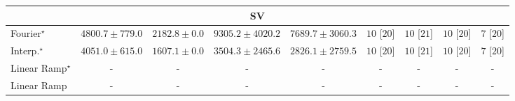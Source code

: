\begin{tabular}{l|cccc|cccc|}
\cline{1-9}
\multicolumn{9}{c}{\rule{0pt}{8pt}SV} \\
\midrule
Fourier$^\star$ & {\cellcolor[HTML]{96B6D7}} \color[HTML]{000000} $4800.7\pm 779.0$ & {\cellcolor[HTML]{F4EDF6}} \color[HTML]{000000} $2182.8\pm 0.0$ & {\cellcolor[HTML]{023858}} \color[HTML]{F1F1F1} $9305.2\pm 4020.2$ & {\cellcolor[HTML]{0569A4}} \color[HTML]{F1F1F1} $7689.7\pm 3060.3$ & {\cellcolor[HTML]{49006A}} \color[HTML]{F1F1F1} $10$ [$20$] & {\cellcolor[HTML]{49006A}} \color[HTML]{F1F1F1} $10$ [$21$] & {\cellcolor[HTML]{49006A}} \color[HTML]{F1F1F1} $10$ [$20$] & {\cellcolor[HTML]{CD238F}} \color[HTML]{F1F1F1} $7$ [$20$] \\
Interp.$^\star$ & {\cellcolor[HTML]{B9C6E0}} \color[HTML]{000000} $4051.0\pm 615.0$ & {\cellcolor[HTML]{FFF7FB}} \color[HTML]{000000} $1607.1\pm 0.0$ & {\cellcolor[HTML]{D1D2E6}} \color[HTML]{000000} $3504.3\pm 2465.6$ & {\cellcolor[HTML]{E5E1EF}} \color[HTML]{000000} $2826.1\pm 2759.5$ & {\cellcolor[HTML]{49006A}} \color[HTML]{F1F1F1} $10$ [$20$] & {\cellcolor[HTML]{49006A}} \color[HTML]{F1F1F1} $10$ [$21$] & {\cellcolor[HTML]{49006A}} \color[HTML]{F1F1F1} $10$ [$20$] & {\cellcolor[HTML]{CD238F}} \color[HTML]{F1F1F1} $7$ [$20$] \\
Linear Ramp$^\star$ & {\cellcolor[HTML]{000000}} \color[HTML]{F1F1F1} {\cellcolor{white}} \color{black} - & {\cellcolor[HTML]{000000}} \color[HTML]{F1F1F1} {\cellcolor{white}} \color{black} - & {\cellcolor[HTML]{000000}} \color[HTML]{F1F1F1} {\cellcolor{white}} \color{black} - & {\cellcolor[HTML]{000000}} \color[HTML]{F1F1F1} {\cellcolor{white}} \color{black} - & {\cellcolor[HTML]{000000}} \color[HTML]{F1F1F1} {\cellcolor{white}} \color{black} - & {\cellcolor[HTML]{000000}} \color[HTML]{F1F1F1} {\cellcolor{white}} \color{black} - & {\cellcolor[HTML]{000000}} \color[HTML]{F1F1F1} {\cellcolor{white}} \color{black} - & {\cellcolor[HTML]{000000}} \color[HTML]{F1F1F1} {\cellcolor{white}} \color{black} - \\
Linear Ramp & {\cellcolor[HTML]{000000}} \color[HTML]{F1F1F1} {\cellcolor{white}} \color{black} - & {\cellcolor[HTML]{000000}} \color[HTML]{F1F1F1} {\cellcolor{white}} \color{black} - & {\cellcolor[HTML]{000000}} \color[HTML]{F1F1F1} {\cellcolor{white}} \color{black} - & {\cellcolor[HTML]{000000}} \color[HTML]{F1F1F1} {\cellcolor{white}} \color{black} - & {\cellcolor[HTML]{000000}} \color[HTML]{F1F1F1} {\cellcolor{white}} \color{black} - & {\cellcolor[HTML]{000000}} \color[HTML]{F1F1F1} {\cellcolor{white}} \color{black} - & {\cellcolor[HTML]{000000}} \color[HTML]{F1F1F1} {\cellcolor{white}} \color{black} - & {\cellcolor[HTML]{000000}} \color[HTML]{F1F1F1} {\cellcolor{white}} \color{black} - \\

\end{tabular}
